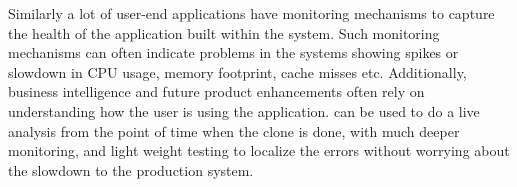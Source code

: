 Similarly a lot of user-end applications have monitoring mechanisms to capture the health of the application built within the system.
Such monitoring mechanisms can often indicate problems in the systems showing spikes or slowdown in CPU usage, memory footprint, cache misses etc.
Additionally, business intelligence and future product enhancements often rely on understanding how the user is using the application.
\parikshan can be used to do a live analysis from the point of time when the clone is done, with much deeper monitoring, and light weight testing to localize the errors without worrying about the slowdown to the production system.

